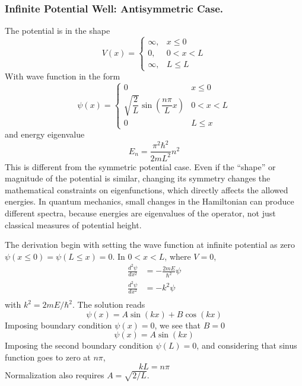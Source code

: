\documentclass[../../../main.tex]{subfiles}
\begin{document}
\subsubsection{Infinite Potential Well: Antisymmetric Case.}
The potential is in the shape
\begin{equation*}
  V(x)=
  \begin{cases}
    \infty, & x \leq0  \\
    0,      & 0<x<L    \\
    \infty, & L \leq L
  \end{cases}
\end{equation*}
With wave function in the form
\begin{equation*}
  \psi(x)=\begin{cases}
    0                                          & x\leq 0   \\
    \sqrt{\dfrac{2}{L}}\sin( \dfrac{n\pi}{L}x) & 0 < x < L \\
    0                                          & L \leq x
  \end{cases}
\end{equation*}
and energy eigenvalue
\begin{equation*}
  E_n=\frac{\pi^2\hbar^2}{2mL^2}n^2
\end{equation*}
This is different from the symmetric potential case.
Even if the “shape” or magnitude of the potential is similar, changing its symmetry changes the mathematical constraints on eigenfunctions, which directly affects the allowed energies.
In quantum mechanics, small changes in the Hamiltonian can produce different spectra, because energies are eigenvalues of the operator, not just classical measures of potential height.

The derivation begin with setting the wave function at infinite potential as zero $\psi(x \leq 0)=\psi(L\leq x)=0$.
In $0 < x < L$, where $ V = 0$,
\begin{align*}
  \frac{d^2\psi}{dx^2} & = -\frac{2mE}{\hbar^2}\psi \\
  \frac{d^2\psi}{dx^2} & = -k^2\psi                 \\
\end{align*}
with $k^2 =2 m E/\hbar^2$.
The solution reads
\begin{equation*}
  \psi(x)=A\sin (kx)+ B \cos (kx)
\end{equation*}
Imposing boundary condition $\psi(x)=0$, we see that $B=0$
\begin{equation*}
  \psi(x)=A\sin (kx)
\end{equation*}
Imposing the second boundary condition $\psi(L)=0$, and considering that sinus function goes to zero at $n\pi$,
\begin{equation*}
  kL=n\pi
\end{equation*}
Normalization also requires $A = \sqrt{2/L}$.
\end{document}
